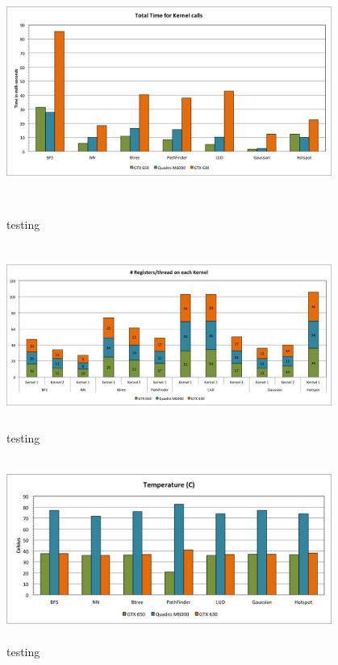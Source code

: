 \documentclass[paper=a4, fontsize=11pt]{scrartcl}
\numberwithin{equation}{section}		%
\numberwithin{figure}{section}			%
\numberwithin{table}{section}				%
\begin{document}
\begin{figure}[!h]
\centering
\includegraphics[width=0.95\textwidth,height=8cm]{../imgs/kernel_calls.png}
\caption{testing}
\label{??}
\end{figure}

\begin{figure}[!h]
\centering
\includegraphics[width=0.95\textwidth,height=6cm]{../imgs/register_thread.png}
\caption{testing}
\label{??}
\end{figure}

\begin{figure}[!h]
\centering
\includegraphics[width=0.95\textwidth,height=6cm]{../imgs/temp.png}
\caption{testing}
\label{??}
\end{figure}
\end{document}
